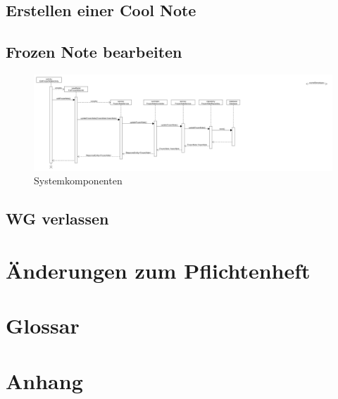\documentclass[a4paper]{scrreprt}
\begin{document}
	 
		\section{Erstellen einer Cool Note}
		
	      
		\section{Frozen Note bearbeiten}
 	\begin{figure}[H]
	       \centering
	       \includegraphics[scale = .15]{Sequenzdiagram_EditFrozenNote.png}
	       \caption{Systemkomponenten}
	      \end{figure}		
		
		\section{WG verlassen}


\chapter{Änderungen zum Pflichtenheft}

\chapter{Glossar}

\chapter{Anhang}
\end{document}
